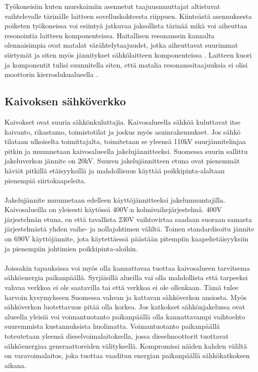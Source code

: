 \documentclass[finnish,12pt,a4paper,pdftex,elec,utf8]{aaltothesis}
\begin{document}
Työkoneisiin kuten murskaimiin asennetut taajuusmuuttajat altistuvat vaihtelevalle tärinälle laitteen sovelluskohteesta riippuen. Kiinteästä asennuksesta poiketen työkoneissa voi esiintyä jatkuvaa jaksollista tärinää mikä voi aiheuttaa resonointia laitteen komponenteissa. Haitallisen resonanssin kannalta olennaisimpia ovat matalat värähtelytaajuudet, jotka aiheuttavat suurimmat siirtymät ja siten myös jännitykset sähkölaitteen komponenteissa \cite{Vibration}. Laitteen kuori ja komponentit tulisi suunnitella siten, että matalia resonanssitaajuuksia ei olisi moottorin kierroslukualueella \cite{Vibration}.

\subsection{Kaivoksen sähköverkko}
Kaivokset ovat suuria sähkönkuluttajia. Kaivosalueella sähköä kuluttavat itse kaivanto, rikastamo, toimistotilat ja joskus myös asuinrakennukset. Jos sähkö tilataan ulkoiselta toimittajalta, toimitetaan se yleensä 110kV suurjännitelinjaa pitkin ja muunnetaan kaivosalueella jakelujännitteeksi. Suomessa suurin sallittu jakeluverkon jännite on 20kV. Suuren jakelujännitteen etuna ovat pienemmät häviöt pitkillä etäisyyksillä ja mahdollisuus käyttää poikkipinta-alaltaan pienempiä siirtokaapeleita. \cite[s. 251-253]{Hakapää}
\\\\
Jakelujännite muunnetaan edelleen käyttöjännitteeksi jakelumuuntajilla. Kaivosalueilla on yleisesti käytössä 400V:n kolmivaihejärjestelmä. 400V järjestelmän etuna, en että tavallista 230V vaihtovirtaa saadaan suoraan samasta järjestelmästä yhden vaihe- ja nollajohtimen väliltä. Toinen standardisoitu jännite on 690V käyttöjännite, jota käytettäessä päästään pitempiin kaapelietäisyyksiin ja pienempiin johtimien poikkipinta-aloihin. \cite[s. 251-253]{Hakapää}
\\\\
Joissakin tapauksissa voi myös olla kannattavaa tuottaa kaivosalueen tarvitsema sähköenergia paikanpäällä. Syrjäisillä alueilla vai olla mahdollista että tarpeeksi vahvaa verkkoa ei ole saatavilla tai että verkkoa ei ole ollenkaan. Tämä tulee harvoin kysymykseen Suomessa vahvan ja kattavan sähköverkon ansiosta. Myös sähköverkon luotettavuus pitää olla korkea. Jos katkokset sähkönjakelussa ovat alueella yleisiä voi voimantuotanto paikanpäällä olla kannattavampi vaihtoehto suuremmista kustannuksista huolimatta. Voimantuotanto paikanpäällä toteutetaan yleensä dieselvoimalaitoksella, jossa dieselmoottorit tuottavat sähköenergiaa generaattoreiden välityksellä. Kompromissi näiden kahden väliltä on varavoimalaitos, joka tuottaa vaaditun energian paikanpäällä sähkökatkoksen aikana. \cite[s. 251-253]{Hakapää}
\end{document}
